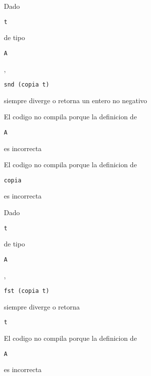 \documentclass{gift}
\begin{document}
\begin{giftMO}
\item \begin{giftFragmento}
Dado\end  {giftFragmento}

\verb!t!
\begin{giftFragmento}
de tipo\end  {giftFragmento}

\verb!A!
\begin{giftFragmento}
,\end  {giftFragmento}

\verb!snd (copia t)!
\begin{giftFragmento}
siempre diverge o retorna un entero no negativo\end  {giftFragmento}


\item \begin{giftFragmento}
El codigo no compila porque la definicion de\end  {giftFragmento}

\verb!A!
\begin{giftFragmento}
es incorrecta\end  {giftFragmento}


\item \begin{giftFragmento}
El codigo no compila porque la definicion de\end  {giftFragmento}

\verb!copia!
\begin{giftFragmento}
es incorrecta\end  {giftFragmento}


\item \begin{giftFragmento}
Dado\end  {giftFragmento}

\verb!t!
\begin{giftFragmento}
de tipo\end  {giftFragmento}

\verb!A!
\begin{giftFragmento}
,\end  {giftFragmento}

\verb!fst (copia t)!
\begin{giftFragmento}
siempre diverge o retorna\end  {giftFragmento}

\verb!t!
\begin{giftFragmento}
\end  {giftFragmento}


\item \begin{giftFragmento}
El codigo no compila porque la definicion de\end  {giftFragmento}

\verb!A!
\begin{giftFragmento}
es incorrecta\end  {giftFragmento}


\end  {giftMO}
\end{document}
